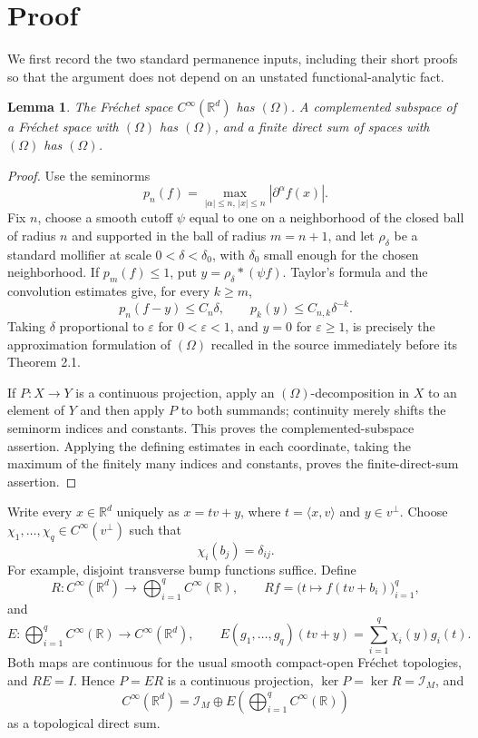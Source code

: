 \documentclass[10pt]{article}
\newtheorem{lemma}[theorem]{Lemma}
\newcommand{\R}{\mathbb R}
\newcommand{\I}{\mathcal I}
\newcommand{\Om}{(\Omega)}
\newcommand{\Cin}{C^\infty}
\begin{document}
\section*{Proof}

We first record the two standard permanence inputs, including their short
proofs so that the argument does not depend on an unstated functional-analytic
fact.

\begin{lemma}\label{lem:permanence}
The Fr\'echet space \(\Cin(\R^d)\) has \(\Om\).  A complemented subspace of a
Fr\'echet space with \(\Om\) has \(\Om\), and a finite direct sum of spaces
with \(\Om\) has \(\Om\).
\end{lemma}

\begin{proof}
Use the seminorms
\[
 p_n(f)=\max_{|\alpha|\le n,\,|x|\le n}|\partial^\alpha f(x)|.
\]
Fix \(n\), choose a smooth cutoff \(\psi\) equal to one on a neighborhood
of the closed ball of radius \(n\) and supported in the ball of radius
\(m=n+1\), and let \(\rho_\delta\) be a standard mollifier at scale
\(0<\delta<\delta_0\), with \(\delta_0\) small enough for the chosen
neighborhood.  If \(p_m(f)\le1\), put
\(y=\rho_\delta*(\psi f)\).  Taylor's formula and the convolution estimates
give, for every \(k\ge m\),
\[
 p_n(f-y)\le C_n\delta,
 \qquad p_k(y)\le C_{n,k}\delta^{-k}.
\]
Taking \(\delta\) proportional to \(\varepsilon\) for
\(0<\varepsilon<1\), and \(y=0\) for \(\varepsilon\ge1\), is precisely the
approximation formulation of \(\Om\) recalled in the source immediately
before its Theorem 2.1.

If \(P:X\to Y\) is a continuous projection, apply an \(\Om\)-decomposition
in \(X\) to an element of \(Y\) and then apply \(P\) to both summands;
continuity merely shifts the seminorm indices and constants.  This proves
the complemented-subspace assertion.  Applying the defining estimates in
each coordinate, taking the maximum of the finitely many indices and
constants, proves the finite-direct-sum assertion.
\end{proof}

Write every \(x\in\R^d\) uniquely as \(x=tv+y\), where
\(t=\langle x,v\rangle\) and \(y\in v^\perp\).  Choose
\(\chi_1,\ldots,\chi_q\in\Cin(v^\perp)\) such that
\[
 \chi_i(b_j)=\delta_{ij}.
\]
For example, disjoint transverse bump functions suffice.  Define
\[
 R:\Cin(\R^d)\longrightarrow\bigoplus_{i=1}^q\Cin(\R),
 \qquad Rf=\bigl(t\mapsto f(tv+b_i)\bigr)_{i=1}^q,
\]
and
\[
 E:\bigoplus_{i=1}^q\Cin(\R)\longrightarrow\Cin(\R^d),
 \qquad E(g_1,\ldots,g_q)(tv+y)=\sum_{i=1}^q\chi_i(y)g_i(t).
\]
Both maps are continuous for the usual smooth compact-open Fr\'echet
topologies, and \(RE=I\).  Hence \(P=ER\) is a continuous projection,
\(\ker P=\ker R=\I_M\), and
\begin{equation}
 \Cin(\R^d)=\I_M\oplus E\!\left(\bigoplus_{i=1}^q\Cin(\R)\right)
 \label{eq:ambient-split}
\end{equation}
as a topological direct sum.
\end{document}
